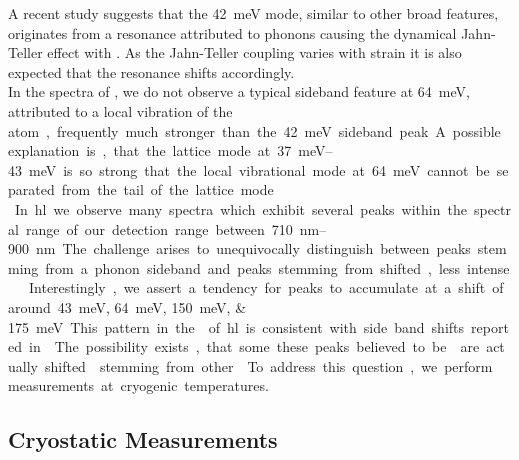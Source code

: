 		A recent study \cite{Londero2016} suggests that the \SI{42}{meV} mode, similar to other broad \psb features, originates from a resonance attributed to phonons causing the dynamical Jahn-Teller effect with \sivs \cite{Fu2009}.
		As the Jahn-Teller coupling varies with strain it is also expected that the resonance shifts accordingly.
		\\
		In the spectra of \vl, we do not observe a typical \siv sideband feature at \SI{64}{meV}, attributed to a local vibration of the \si atom, frequently much stronger than the  \SI{42}{meV} sideband peak.
		A possible explanation is, that the lattice mode at \SIrange{37}{43}{meV} is so strong that the local vibrational mode at \SI{64}{meV} cannot be separated from the tail of the lattice mode.
		\\
		In \hl we observe many spectra which exhibit several peaks within the spectral range of our detection range between \SIrange{710}{900}{nm}.
		The challenge arises to unequivocally distinguish between peaks stemming from a phonon sideband and peaks stemming from shifted, less intense \siv \ZPLs.

		Interestingly, we assert a tendency for peaks to accumulate at a shift of around \SIlist{43;64;150;175}{meV}. This pattern in the \psb of \hl is consistent with side band shifts reported in \cite{Sternschulte1994,Zaitsev2000, Neu2011}.

		The possibility exists, that some these peaks believed to be \psbs are actually shifted \ZPLs stemming from other \sivs. To address this question, we perform \pl measurements at cryogenic temperatures.


		\subsection{Cryostatic Measurements}\label{subsec::cryo}

